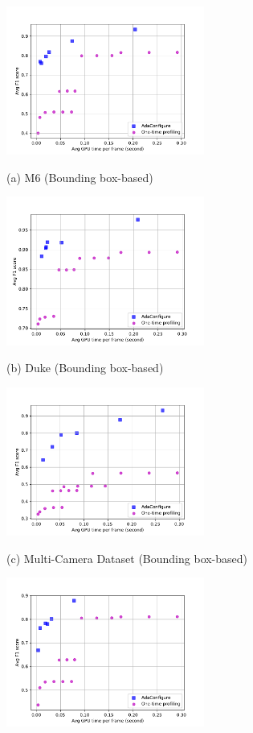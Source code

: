 \begin{figure}[!t]
	\begin{minipage}[t]{0.32\linewidth}
		\centerline{\includegraphics[width=6.5cm]{figures/m6.pdf}}
		\centerline{(a) M6 (Bounding box-based)}
	\end{minipage}
	\hfill
	\begin{minipage}[t]{0.32\linewidth}
		\centerline{\includegraphics[width=6.5cm]{figures/duke.pdf}}
		\centerline{(b) Duke (Bounding box-based)}
	\end{minipage}
	\hfill
	\begin{minipage}[t]{0.32\linewidth}
		\centerline{\includegraphics[width=6.5cm]{figures/_Westbound_Eastbound_Rear.pdf}}
		\centerline{(c) Multi-Camera Dataset (Bounding box-based)}
	\end{minipage}
	\vfill
	\vspace{0.4cm}
	\begin{minipage}[t]{0.32\linewidth}
		\centerline{\includegraphics[width=6.5cm]{figures/m6_label.pdf}}

\end{minipage}
\end{figure}
